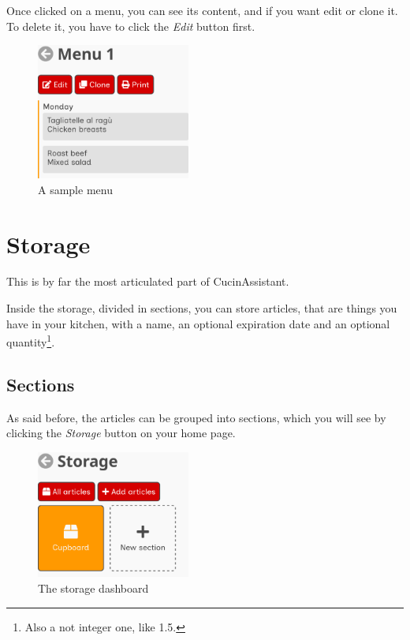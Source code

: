 \documentclass[12pt, a4paper]{report}
\begin{document}
    Once clicked on a menu, you can see its content, and if you want edit or clone it. To delete it, you have to click the \emph{Edit} button first.

    \begin{figure}[H]
        \centering
        \includegraphics[width=0.45\textwidth]{assets/en/menu.png}
        \caption{A sample menu}
    \end{figure}



    \chapter{Storage}

    This is by far the most articulated part of CucinAssistant.

    Inside the storage, divided in sections, you can store articles, that are things you have in your kitchen, with a name, an optional expiration
    date and an optional quantity\footnote{Also a not integer one, like 1.5.}.

	\section{Sections} \label{storagearticles}

    As said before, the articles can be grouped into sections, which you will see by clicking the \emph{Storage} button on your home page.

    \begin{figure}[H]
        \centering
        \includegraphics[width=0.45\textwidth]{assets/en/storage.png}
        \caption{The storage dashboard}
    \end{figure}
\end{document}
